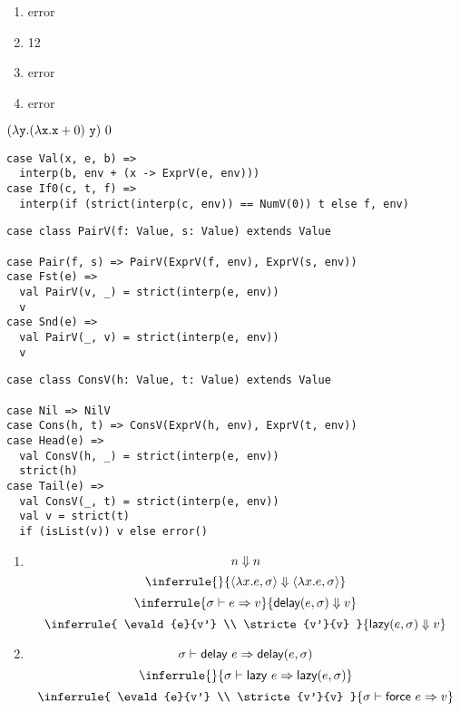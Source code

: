 \textbf{}
\begin{enumerate}
  \item error
  \item 12
  \item error
  \item error
\end{enumerate}

\textbf{}

$(\lambda\texttt{y}.(\lambda\texttt{x}.\texttt{x}+0)\ \texttt{y})\ 0$
\\

\textbf{}
\vspace{-1em}
\begin{verbatim}
case Val(x, e, b) =>
  interp(b, env + (x -> ExprV(e, env)))
case If0(c, t, f) =>
  interp(if (strict(interp(c, env)) == NumV(0)) t else f, env)
\end{verbatim}

\textbf{}
\vspace{-1em}
\begin{verbatim}
case class PairV(f: Value, s: Value) extends Value

case Pair(f, s) => PairV(ExprV(f, env), ExprV(s, env))
case Fst(e) =>
  val PairV(v, _) = strict(interp(e, env))
  v
case Snd(e) =>
  val PairV(_, v) = strict(interp(e, env))
  v
\end{verbatim}

\textbf{}
\vspace{-1em}
\begin{verbatim}
case class ConsV(h: Value, t: Value) extends Value

case Nil => NilV
case Cons(h, t) => ConsV(ExprV(h, env), ExprV(t, env))
case Head(e) =>
  val ConsV(h, _) = strict(interp(e, env))
  strict(h)
case Tail(e) =>
  val ConsV(_, t) = strict(interp(e, env))
  val v = strict(t)
  if (isList(v)) v else error()
\end{verbatim}

\textbf{}
\begin{enumerate}
  \item
    \[
      n\Downarrow n
    \]
    \[
      \inferrule
      {}
      { \stricte{\clov{x}{e}{\sigma}}{\clov{x}{e}{\sigma}} }
    \]
    \[
      \inferrule
      { \evald{e}{v} }
      { \stricte{\delay(e,\sigma)}{v} }
    \]
    \[
      \inferrule
      { \evald{e}{v'} \\ \stricte{v'}{v} }
      { \stricte{\lazy(e,\sigma)}{v} }
    \]
  \item
    \[
      \evald{\delay\ e}{\delay(e,\sigma)}
    \]
    \[
      \inferrule
      {}
      { \evald{\lazy\ e}{\lazy(e,\sigma)} }
    \]
    \[
      \inferrule
      { \evald{e}{v'} \\ \stricte{v'}{v} }
      { \evald{\force\ e}{v} }
    \]
\end{enumerate}


